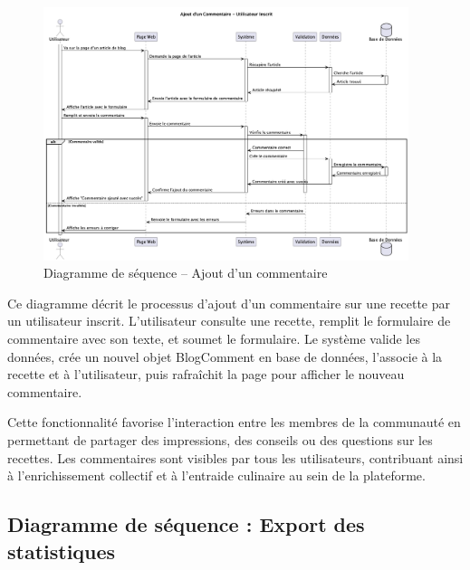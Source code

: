 \documentclass[12pt,a4paper]{report}
\begin{document}
\begin{figure}[H]
    \centering
    \includegraphics[width=0.95\textwidth]{sequence_diagram_ajout_commentaire.png}
    \caption{Diagramme de séquence – Ajout d'un commentaire}
    \label{fig:sequence_ajout_commentaire}
\end{figure}

Ce diagramme décrit le processus d'ajout d'un commentaire sur une recette par un utilisateur inscrit. L'utilisateur consulte une recette, remplit le formulaire de commentaire avec son texte, et soumet le formulaire. Le système valide les données, crée un nouvel objet BlogComment en base de données, l'associe à la recette et à l'utilisateur, puis rafraîchit la page pour afficher le nouveau commentaire.

Cette fonctionnalité favorise l'interaction entre les membres de la communauté en permettant de partager des impressions, des conseils ou des questions sur les recettes. Les commentaires sont visibles par tous les utilisateurs, contribuant ainsi à l'enrichissement collectif et à l'entraide culinaire au sein de la plateforme.

\subsection{Diagramme de séquence : Export des statistiques}
\end{document}

